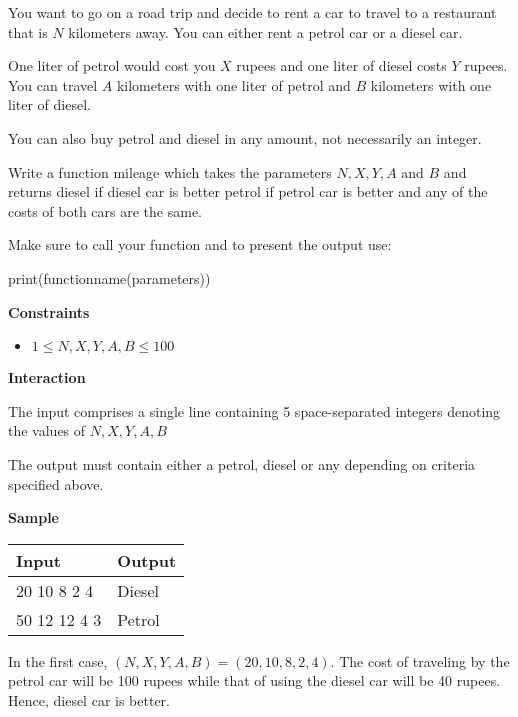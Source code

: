\documentclass[a4paper]{exam}
\newcommand\heading[1]{\textbf{#1}}
\newcommand\alert[2]{\centerline{\textbf\large{\underline{\color{#1}{#2}}}}}
\begin{document}
\begin{questions}
\begin{enumerate}
\end{enumerate}


\alert{Green} {This means the applied logic is correct}



    You want to go on a road trip and decide to rent a car to travel to a restaurant that is $N$ kilometers away. You can either rent a petrol car or a diesel car.

    One liter of petrol would cost you $X$ rupees and one liter of diesel costs $Y$ rupees. You can travel $A$ kilometers with one liter of petrol and $B$ kilometers with one liter of diesel.

    You can also buy petrol and diesel in any amount, not necessarily an integer.

    Write a function mileage which takes the parameters $N,X,Y,A$ and $B$ and returns diesel if diesel car is better petrol if petrol car is better and any of the costs of both cars are the same.

    Make sure to call your function and to present the output use:

    print(functionname(parameters))

    \heading{Constraints}
    \begin{itemize}
        \item $ 1 \leq N,X,Y,A,B \le 100 $

    \end{itemize}

    \heading{Interaction}

    The input comprises a single line containing 5 space-separated integers denoting the values of $N,X,Y,A,B$

    The output must contain either a petrol, diesel or any depending on criteria specified above.

    \heading{Sample}

    \begin{tabularx}{\textwidth}{|X|X|}
        \rowcolor{gray!50}
        \hline
        Input        & Output \\ \hline\hline
        20 10 8 2 4  & Diesel \\\hline
        50 12 12 4 3 & Petrol \\\hline
    \end{tabularx}

    In the first case, $(N,X,Y,A,B)=(20,10,8,2,4)$. The cost of traveling by the petrol car will be 100 rupees while that of using the diesel car will be
    40 rupees. Hence, diesel car is better.


\end{questions}
\end{document}
